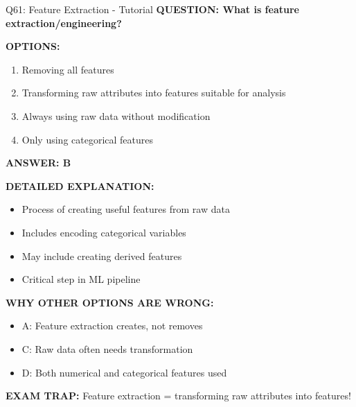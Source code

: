\documentclass[8pt]{beamer}
\begin{document}
	\begin{frame}{Q61: Feature Extraction - Tutorial}
		\fontsize{6.5}{7.5}\selectfont
		\textbf{QUESTION: What is feature extraction/engineering?}
		
		\vspace{0.1cm}
		\textbf{OPTIONS:}
		\begin{enumerate}
			\item Removing all features
			\item Transforming raw attributes into features suitable for analysis
			\item Always using raw data without modification
			\item Only using categorical features
		\end{enumerate}
		
		\vspace{0.1cm}
		\textcolor{myblue}{\textbf{ANSWER: B}}
		
		\vspace{0.1cm}
		\textbf{DETAILED EXPLANATION:}
		\begin{itemize}
			\item Process of creating useful features from raw data
			\item Includes encoding categorical variables
			\item May include creating derived features
			\item Critical step in ML pipeline
		\end{itemize}
		
		\vspace{0.1cm}
		\textcolor{myred}{\textbf{WHY OTHER OPTIONS ARE WRONG:}}
		\begin{itemize}
			\item \textcolor{myred}{A:} Feature extraction creates, not removes
			\item \textcolor{myred}{C:} Raw data often needs transformation
			\item \textcolor{myred}{D:} Both numerical and categorical features used
		\end{itemize}
		
		\textcolor{myred}{\textbf{EXAM TRAP:}} Feature extraction = \textcolor{myblue}{transforming raw attributes into features}!
	\end{frame}
	
\end{document}
